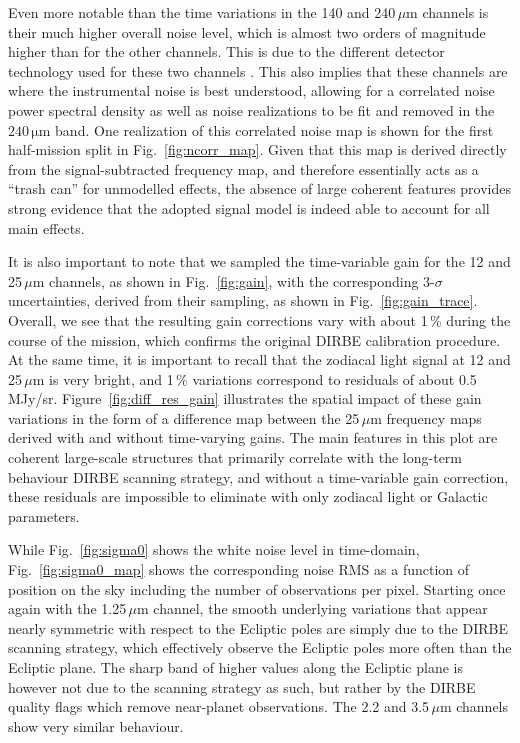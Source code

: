 \documentclass{aa}
\begin{document}
Even more notable than the time variations in the 140 and 240$\,\mu$m
channels is their much higher overall noise level, which is almost
two orders of magnitude higher than for the other channels. This is
due to the different detector technology used for these two channels
\citep{hauser1998}.  This also implies that these channels are where
the instrumental noise is best understood, allowing for a correlated
noise power spectral density as well as noise realizations to be fit and removed in the
$240\,\mathrm{\mu m}$ band. One realization of this correlated noise
map is shown for the first half-mission split in
Fig.~\ref{fig:ncorr_map}. Given that this map is derived directly from
the signal-subtracted frequency map, and therefore essentially acts as
a ``trash can'' for unmodelled effects, the absence of large coherent
features provides strong evidence that the adopted signal model is
indeed able to account for all main effects. 

It is also important to note that we sampled the time-variable gain for the 12 and 25$\,\mu$m
channels, as shown in Fig.~\ref{fig:gain}, with the corresponding 3-$\sigma$ uncertainties,
derived from their sampling, as shown in Fig.~\ref{fig:gain_trace}. Overall, we see that the resulting gain corrections vary with about 1\,\% during the course of the mission, which confirms the original DIRBE calibration procedure. At the same time, it is important to recall that the zodiacal light signal at 12 and 25\,$\mu$m is very bright, and 1\,\% variations correspond to residuals of about 0.5\,MJy/sr. Figure~\ref{fig:diff_res_gain} illustrates the spatial impact of these gain variations in the form of a difference map between the 25\,$\mu$m frequency maps derived with and without time-varying gains. The main features in this plot are coherent large-scale structures that primarily correlate with the long-term behaviour DIRBE scanning strategy, and without a time-variable gain correction, these residuals are impossible to eliminate with only zodiacal light or Galactic parameters.

While Fig.~\ref{fig:sigma0} shows the white noise level in
time-domain, Fig.~\ref{fig:sigma0_map} shows the corresponding noise
RMS as a function of position on the sky including the
number of observations per pixel. Starting once again with the
1.25$\,\mu$m channel, the smooth underlying variations that appear
nearly symmetric with respect to the Ecliptic poles are simply due to
the DIRBE scanning strategy, which effectively observe the Ecliptic
poles more often than the Ecliptic plane. The sharp band of higher
values along the Ecliptic plane is however not due to the scanning
strategy as such, but rather by the DIRBE quality flags which remove
near-planet observations. The 2.2 and 3.5$\,\mu$m channels show very
similar behaviour.
\end{document}
